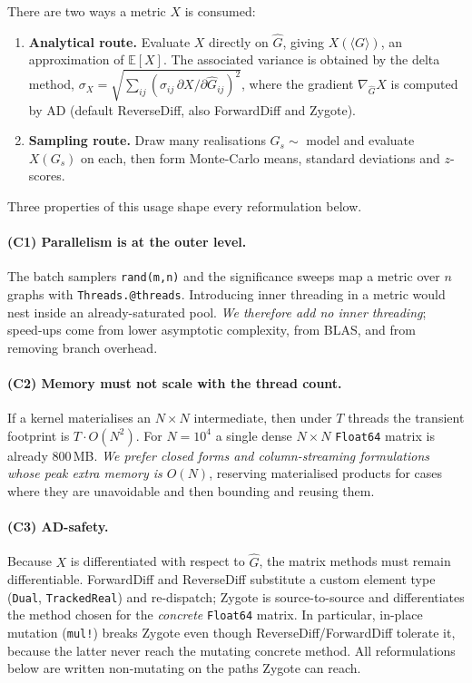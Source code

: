 \documentclass[11pt]{article}
\theoremstyle{plain}
\theoremstyle{definition}
\newcommand{\Ghat}{\hat{G}}
\begin{document}
There are two ways a metric $X$ is consumed:
\begin{enumerate}
  \item \textbf{Analytical route.} Evaluate $X$ directly on $\Ghat$, giving $X(\langle G\rangle)$, an
  approximation of $\mathbb{E}[X]$. The associated variance is obtained by the delta method,
  $\sigma_X = \sqrt{\sum_{ij}(\sigma_{ij}\,\partial X/\partial \Ghat_{ij})^2}$, where the gradient
  $\nabla_{\Ghat} X$ is computed by AD (default ReverseDiff, also ForwardDiff and Zygote).
  \item \textbf{Sampling route.} Draw many realisations $G_s\sim$ model and evaluate $X(G_s)$ on each,
  then form Monte-Carlo means, standard deviations and $z$-scores.
\end{enumerate}

Three properties of this usage shape every reformulation below.

\paragraph{(C1) Parallelism is at the outer level.} The batch samplers \texttt{rand(m,n)} and the
significance sweeps map a metric over $n$ graphs with \texttt{Threads.@threads}. Introducing inner
threading in a metric would nest inside an already-saturated pool. \emph{We therefore add no inner
threading}; speed-ups come from lower asymptotic complexity, from BLAS, and from removing branch overhead.

\paragraph{(C2) Memory must not scale with the thread count.} If a kernel materialises an $N\times N$
intermediate, then under $T$ threads the transient footprint is $T\cdot O(N^2)$. For $N=10^4$ a single dense
$N\times N$ \texttt{Float64} matrix is already $800$\,MB. \emph{We prefer closed forms and column-streaming
formulations whose \emph{peak} extra memory is $O(N)$}, reserving materialised products for cases where they
are unavoidable and then bounding and reusing them.

\paragraph{(C3) AD-safety.} Because $X$ is differentiated with respect to $\Ghat$, the matrix methods must
remain differentiable. ForwardDiff and ReverseDiff substitute a custom element type
(\texttt{Dual}, \texttt{TrackedReal}) and re-dispatch; Zygote is source-to-source and differentiates the
method chosen for the \emph{concrete} \texttt{Float64} matrix. In particular, in-place mutation
(\texttt{mul!}) breaks Zygote even though ReverseDiff/ForwardDiff tolerate it, because the latter never
reach the mutating concrete method. All reformulations below are written non-mutating on the paths Zygote
can reach.
\end{document}

